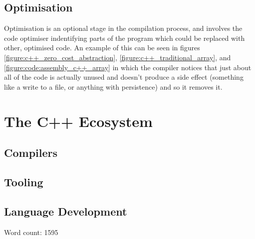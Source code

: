 \documentclass{article}
\begin{document}
\subsection{Optimisation}\label{stages_of_compilation:optimisation}
Optimisation is an optional stage in the compilation process, and involves the code optimiser indentifying parts of the program which could be replaced with other, optimised code. An example of this can be seen in figures \ref{figure:c++_zero_cost_abstraction}, \ref{figure:c++_traditional_array}, and \ref{figure:code:assembly_c++_array} in which the compiler notices that just about all of the code is actually unused and doesn't produce a side effect (something like a write to a file, or anything with persistence) and so it removes it.
\newpage

\section{The C++ Ecosystem}
\subsection{Compilers}
\subsection{Tooling}
\subsection{Language Development}


\printbibliography[heading=none]

\printglossary[type=main]

Word count: 1595
\end{document}
